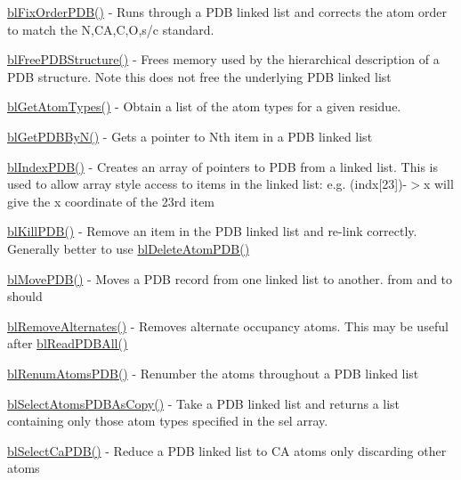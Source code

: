\begin{DoxyItemize}
\item \hyperlink{_order_p_d_b_8c_a906f5c2c60e2384016857f256b060bca}{bl\-Fix\-Order\-P\-D\-B()} -\/ Runs through a P\-D\-B linked list and corrects the atom order to match the N,C\-A,C,O,s/c standard.
\item \hyperlink{pdb_8h_a20dac3f334345da4302df5b1f21b4d6b}{bl\-Free\-P\-D\-B\-Structure()} -\/ Frees memory used by the hierarchical description of a P\-D\-B structure. Note this does not free the underlying P\-D\-B linked list
\item \hyperlink{_order_p_d_b_8c_ad57e5fc3d8794aec833bb5a28b692d0e}{bl\-Get\-Atom\-Types()} -\/ Obtain a list of the atom types for a given residue.
\item \hyperlink{_get_p_d_b_by_n_8c_a38721669b90999a2d5497849b75f3a67}{bl\-Get\-P\-D\-B\-By\-N()} -\/ Gets a pointer to Nth item in a P\-D\-B linked list
\item \hyperlink{_index_p_d_b_8c_a95ee48f286d0f89b7829d832f69d09ca}{bl\-Index\-P\-D\-B()} -\/ Creates an array of pointers to P\-D\-B from a linked list. This is used to allow array style access to items in the linked list\-: e.\-g. (indx\mbox{[}23\mbox{]})-\/$>$x will give the x coordinate of the 23rd item
\item \hyperlink{_kill_p_d_b_8c_af9c2f29c87607425d514dfbd710648b7}{bl\-Kill\-P\-D\-B()} -\/ Remove an item in the P\-D\-B linked list and re-\/link correctly. Generally better to use \hyperlink{_kill_p_d_b_8c_afa0e25249e5978f1ae19b5d8bebb6835}{bl\-Delete\-Atom\-P\-D\-B()}
\item \hyperlink{_move_p_d_b_8c_acae4ff251013238bde8c341d5ff97c46}{bl\-Move\-P\-D\-B()} -\/ Moves a P\-D\-B record from one linked list to another. from and to should
\item \hyperlink{pdb_8h_a10c0ace6d46e2c0a56ce4bea451e76c3}{bl\-Remove\-Alternates()} -\/ Removes alternate occupancy atoms. This may be useful after \hyperlink{pdb_8h_a23cbc720ce99c3bdaf61d42960df970a}{bl\-Read\-P\-D\-B\-All()}
\item \hyperlink{pdb_8h_ae1ff7a56e4d028aef80c0220f59c1358}{bl\-Renum\-Atoms\-P\-D\-B()} -\/ Renumber the atoms throughout a P\-D\-B linked list
\item \hyperlink{pdb_8h_ab6752fd043cf86fcc57fef437f68f758}{bl\-Select\-Atoms\-P\-D\-B\-As\-Copy()} -\/ Take a P\-D\-B linked list and returns a list containing only those atom types specified in the sel array.
\item \hyperlink{pdb_8h_a803184a2bdeaf7ba9096dab94a479bbd}{bl\-Select\-Ca\-P\-D\-B()} -\/ Reduce a P\-D\-B linked list to C\-A atoms only discarding other atoms

\end{DoxyItemize}
